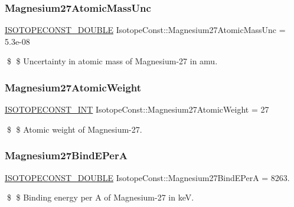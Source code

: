 \subsubsection{\texorpdfstring{Magnesium27\+Atomic\+Mass\+Unc}{Magnesium27AtomicMassUnc}}
{\footnotesize\ttfamily \mbox{\hyperlink{group___isotope_const-_macros_ga8f45a7272ce02c0b4c65c44636ed719a}{I\+S\+O\+T\+O\+P\+E\+C\+O\+N\+S\+T\+\_\+\+D\+O\+U\+B\+LE}} Isotope\+Const\+::\+Magnesium27\+Atomic\+Mass\+Unc = 5.\+3e-\/08}

\$ \$ Uncertainty in atomic mass of Magnesium-\/27 in amu. \mbox{\label{group___isotope_const-_magnesium-_mg27_ga1a558ebbedc0d5dd0d797628f839337a}} 
\subsubsection{\texorpdfstring{Magnesium27\+Atomic\+Weight}{Magnesium27AtomicWeight}}
{\footnotesize\ttfamily \mbox{\hyperlink{group___isotope_const-_macros_ga5f18360b3e99483a35c32d789e62621c}{I\+S\+O\+T\+O\+P\+E\+C\+O\+N\+S\+T\+\_\+\+I\+NT}} Isotope\+Const\+::\+Magnesium27\+Atomic\+Weight = 27}

\$ \$ Atomic weight of Magnesium-\/27. \mbox{\label{group___isotope_const-_magnesium-_mg27_ga07520331a981d07e27e3bb7136a46c06}} 
\subsubsection{\texorpdfstring{Magnesium27\+Bind\+E\+PerA}{Magnesium27BindEPerA}}
{\footnotesize\ttfamily \mbox{\hyperlink{group___isotope_const-_macros_ga8f45a7272ce02c0b4c65c44636ed719a}{I\+S\+O\+T\+O\+P\+E\+C\+O\+N\+S\+T\+\_\+\+D\+O\+U\+B\+LE}} Isotope\+Const\+::\+Magnesium27\+Bind\+E\+PerA = 8263.}

\$ \$ Binding energy per A of Magnesium-\/27 in keV. \mbox{\label{group___isotope_const-_magnesium-_mg27_ga964ea0d5354f00ccb579043b7bf33c47}} 

